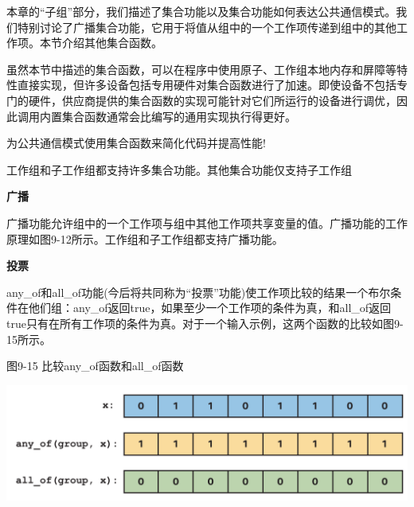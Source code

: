 本章的“子组”部分，我们描述了集合功能以及集合功能如何表达公共通信模式。我们特别讨论了广播集合功能，它用于将值从组中的一个工作项传递到组中的其他工作项。本节介绍其他集合函数。\par

虽然本节中描述的集合函数，可以在程序中使用原子、工作组本地内存和屏障等特性直接实现，但许多设备包括专用硬件对集合函数进行了加速。即使设备不包括专门的硬件，供应商提供的集合函数的实现可能针对它们所运行的设备进行调优，因此调用内置集合函数通常会比编写的通用实现执行得更好。\par

\begin{tcolorbox}[colback=red!5!white,colframe=red!75!black]
为公共通信模式使用集合函数来简化代码并提高性能!
\end{tcolorbox}

工作组和子工作组都支持许多集合功能。其他集合功能仅支持子工作组\par

\hspace*{\fill} \par %
\textbf{广播}

广播功能允许组中的一个工作项与组中其他工作项共享变量的值。广播功能的工作原理如图9-12所示。工作组和子工作组都支持广播功能。\par

\hspace*{\fill} \par %
\textbf{投票}

any\_of和all\_of功能(今后将共同称为“投票”功能)使工作项比较的结果一个布尔条件在他们组：any\_of返回true，如果至少一个工作项的条件为真，和all\_of返回true只有在所有工作项的条件为真。对于一个输入示例，这两个函数的比较如图9-15所示。\par

\hspace*{\fill} \par %
图9-15 比较any\_of函数和all\_of函数
\begin{center}
	\includegraphics[width=1.\textwidth]{content/chapter-9/images/8}
\end{center}

